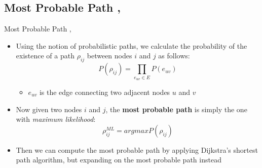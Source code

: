 \documentclass[10pt]{beamer}
\begin{document}
\subsection{Most Probable Path \cite{pfeiffer2010probabilistic}, \cite{pfeiffer2011methods}}
\begin{frame}{Most Probable Path \cite{pfeiffer2010probabilistic}, \cite{pfeiffer2011methods}}
\begin{itemize}
\item Using the notion of probabilistic paths, we calculate the probability of the existence of a path $\rho_{ij}$ between nodes $i$ and $j$ as follows:
\begin{equation*}
P(\rho_{ij}) = \prod_{e_{uv} \in E}P(e_{uv})
\end{equation*}
\vspace{-0.12in}
\begin{itemize}
\item $e_{uv}$ is the edge connecting two adjacent nodes $u$ and $v$
\end{itemize}
\item Now given two nodes $i$ and $j$, the \textbf{most probable path} is simply the one with \textit{maximum likelihood}:
\[ \rho_{ij}^{ML} = argmaxP(\rho_{ij}) \]
\item Then we can compute the most probable path by applying Dijkstra's shortest path algorithm, but expanding on the most probable path instead
\end{itemize}
\end{frame}




\end{document}

